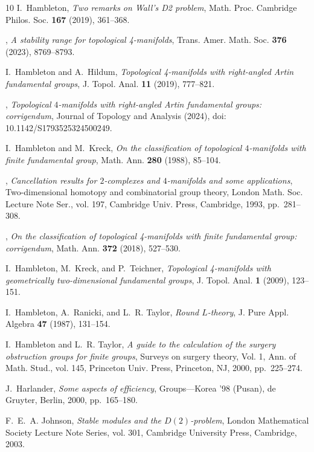 \documentclass[11pt,a4paper,leqno]{amsart}
\theoremstyle{definition}
\theoremstyle{remark}
\begin{document}
\begin{thebibliography}{10}
I.~Hambleton, \emph{Two remarks on {W}all's {D}2 problem}, Math. Proc.
  Cambridge Philos. Soc. \textbf{167} (2019), 361--368.

\bysame, \emph{A stability range for topological 4-manifolds}, Trans. Amer.
  Math. Soc. \textbf{376} (2023), 8769--8793.

I.~Hambleton and A.~Hildum, \emph{Topological 4-manifolds with right-angled
  {A}rtin fundamental groups}, J. Topol. Anal. \textbf{11} (2019), 777--821.

\bysame, \emph{Topological $4$-manifolds with right-angled {A}rtin fundamental
  groups: corrigendum}, Journal of Topology and Analysis (2024), doi:
  10.1142/S1793525324500249.

I.~Hambleton and M.~Kreck, \emph{On the classification of topological
  {$4$}-manifolds with finite fundamental group}, Math. Ann. \textbf{280}
  (1988), 85--104.

\bysame, \emph{Cancellation results for {$2$}-complexes and {$4$}-manifolds and
  some applications}, Two-dimensional homotopy and combinatorial group theory,
  London Math. Soc. Lecture Note Ser., vol. 197, Cambridge Univ. Press,
  Cambridge, 1993, pp.~281--308.

\bysame, \emph{On the classification of topological 4-manifolds with finite
  fundamental group: corrigendum}, Math. Ann. \textbf{372} (2018), 527--530.

I.~Hambleton, M.~Kreck, and P.~Teichner, \emph{Topological 4-manifolds with
  geometrically two-dimensional fundamental groups}, J. Topol. Anal. \textbf{1}
  (2009), 123--151.

I.~Hambleton, A.~Ranicki, and L.~R. Taylor, \emph{Round ${L}$-theory}, J. Pure
  Appl. Algebra \textbf{47} (1987), 131--154.

I.~Hambleton and L.~R. Taylor, \emph{A guide to the calculation of the surgery
  obstruction groups for finite groups}, Surveys on surgery theory, {V}ol. 1,
  Ann. of Math. Stud., vol. 145, Princeton Univ. Press, Princeton, NJ, 2000,
  pp.~225--274.

J.~Harlander, \emph{Some aspects of efficiency}, Groups---{K}orea '98
  ({P}usan), de Gruyter, Berlin, 2000, pp.~165--180.

F.~E.~A. Johnson, \emph{Stable modules and the {$D(2)$}-problem}, London
  Mathematical Society Lecture Note Series, vol. 301, Cambridge University
  Press, Cambridge, 2003.


\end{thebibliography}
\end{document}
